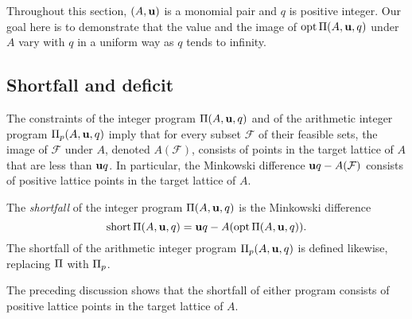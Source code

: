 \documentclass{amsart}
\begin{document}
Throughout this section, $(A, \mathbf{u})$ is a monomial pair and $q$ is positive integer.
Our goal here is to demonstrate that the value and the image of $\operatorname{opt}\Pi(A, \mathbf{u}, q)$ under $A$
vary with $q$ in a uniform way as $q$ tends to infinity.

\subsection{Shortfall and deficit}

The constraints of the integer program $\Pi(A,\mathbf{u},q)$ and of the arithmetic integer program $\Pi_p(A,\mathbf{u},q)$ imply that for every subset $\mathcal{F}$ of their feasible sets, the image of $\mathcal{F}$ under $A$, denoted $A(\mathcal{F})$, consists of points in the target lattice of $A$ that are less than $\mathbf{u}q$.
In particular, the Minkowski difference $\mathbf{u}q-A(\mathcal{F})$ consists of positive lattice points in the target lattice of $A$.

\begin{definition}
   The \emph{shortfall} of the integer program $\Pi(A, \mathbf{u}, q)$ is the Minkowski difference
   \[ \operatorname{short} \Pi(A, \mathbf{u}, q) = \mathbf{u}q - A( \operatorname{opt} \Pi(A, \mathbf{u}, q)).\]
   The shortfall of the arithmetic integer program $\Pi_p(A, \mathbf{u}, q)$ is defined likewise, replacing $\Pi$ with $\Pi_p$.
\end{definition}

The preceding discussion shows that the shortfall of either program consists of positive lattice points in the target lattice of $A$.
\end{document}
